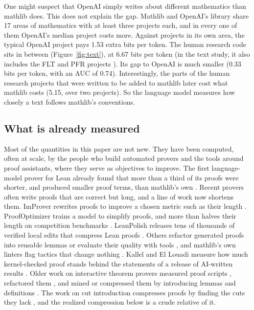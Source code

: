 \documentclass{article}
\begin{document}
One might suspect that OpenAI simply writes about different mathematics than mathlib does. This does not explain
the gap. Mathlib and OpenAI's library share 17 areas of mathematics with at least three projects each, and in every one of
them OpenAI's median project costs more. Against projects in its own area, the typical OpenAI project pays 1.53 extra
bits per token. The human research code sits in between (Figure~\ref{fig:text}), at 6.67 bits per token (in the text study, it also includes the FLT and PFR projects \textit{\parencite{flt_lean,pfr_lean}}). Its gap to OpenAI is much
smaller (0.33 bits per token, with an AUC of 0.74). Interestingly, the parts of the human research projects that were
written to be added to mathlib later cost what mathlib costs (5.15, over two projects). So the language model measures how
closely a text follows mathlib's conventions.

\subsection{What is already measured}
Most of the quantities in this paper are not new. They have been computed, often at scale, by the people who build
automated provers and the tools around proof assistants, where they serve as objectives to improve. The first
language-model prover for Lean already found that more than a third of its proofs were shorter, and produced smaller
proof terms, than mathlib's own \textit{\parencite{han2022pact}}. Recent provers
\textit{\parencite{hubert2025alphaproof,ren2025deepseekprover2,wang2025kimina,lin2025goedel,chen2025seedprover}} often write
proofs that are correct but long, and a line of work now shortens them. ImProver rewrites proofs to improve a chosen
metric such as their length \textit{\parencite{ahuja2024improver}}. ProofOptimizer trains a model to simplify proofs,
and more than halves their length on competition benchmarks \textit{\parencite{gu2025proofoptimizer}}. LeanPolish
releases tens of thousands of verified local edits that compress Lean proofs \textit{\parencite{bourigault2026leanpolish}}.
Others refactor generated proofs into reusable lemmas \textit{\parencite{fu2026proofrefactor}} or evaluate their quality
with tools \textit{\parencite{caldwell2026proofjudge}}, and mathlib's own linters flag tactics that change nothing
\textit{\parencite{mathlib4}}. Kallel and El Louadi measure how much kernel-checked proof stands behind the statements
of a release of AI-written results \textit{\parencite{kallel2026verification}}. Older work on interactive theorem
provers measured proof scripts \textit{\parencite{wiedijk2000debruijn,aspinall2016metrics}}, refactored them
\textit{\parencite{whiteside2011refactoring}}, and mined or compressed them by introducing lemmas and definitions
\textit{\parencite{kaliszyk2013lemma,blanchette2015mining,vyskocil2010compression}}. The work on cut introduction
compresses proofs by finding the cuts they lack \textit{\parencite{hetzl2014quantified,ebner2018lemmas}}, and the
realized compression below is a crude relative of it.
\end{document}
